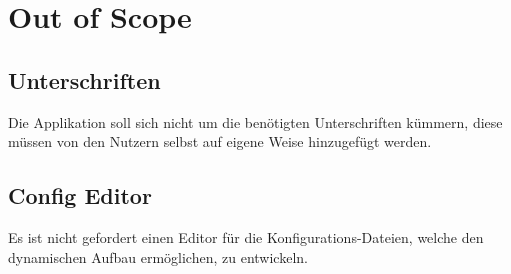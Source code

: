 \section{Out of Scope}\label{sec:nicht-anforderung}
\subsection{Unterschriften}\label{subsec:unterschriften}
Die Applikation soll sich nicht um die benötigten Unterschriften kümmern,
diese müssen von den Nutzern selbst auf eigene Weise hinzugefügt werden.
\subsection{Config Editor}\label{subsec:config-editor}
Es ist nicht gefordert einen Editor für die Konfigurations-Dateien, welche den dynamischen Aufbau ermöglichen, zu entwickeln.